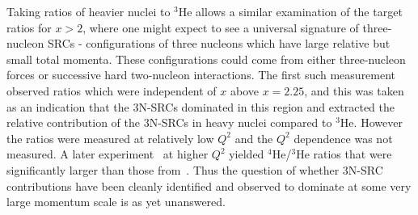 Taking ratios of heavier nuclei to $^3$He allows a similar examination of the target ratios for $x>2$, where one might expect to see a universal
signature of three-nucleon SRCs - configurations of three nucleons which have large relative but small total momenta. These configurations could
come from either three-nucleon forces or successive hard two-nucleon interactions. The first such measurement~\cite{PhysRevLett.96.082501}
observed ratios which were independent of $x$ above $x=2.25$, and this was taken as an indication that the 3N-SRCs dominated in this region and
extracted the relative contribution of the 3N-SRCs in heavy nuclei compared to $^3$He. However the ratios were measured at relatively low $Q^2$
and the $Q^2$ dependence was not measured. A later experiment~\cite{fomin2012} at higher $Q^2$ yielded $^4$He/$^3$He ratios that were
significantly larger than those from~\cite{PhysRevLett.96.082501}. Thus the question of whether 3N-SRC contributions have been cleanly identified
and observed to dominate at some very large momentum scale is as yet unanswered.

%



